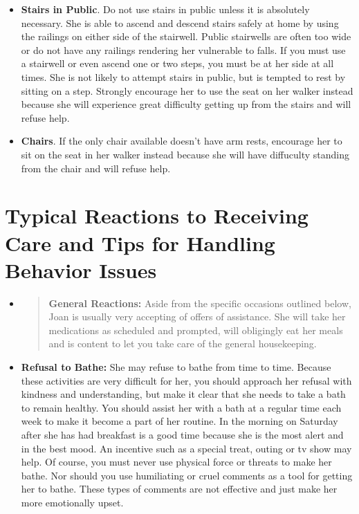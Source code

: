 \documentclass[]{article}
\begin{document}
\begin{itemize}
\item \textbf{Stairs in Public}. Do not use stairs in public unless it is absolutely necessary. She is able to ascend and descend stairs safely at home by using the railings on either side of the stairwell. Public stairwells are often too wide or do not have any railings rendering her vulnerable to falls. If you must use a stairwell or even ascend one or two steps, you must be at her side at all times. She is not likely to attempt stairs in public, but is tempted to rest by sitting on a step. Strongly encourage her to use the seat on her walker instead because she will experience great difficulty getting up from the stairs and will refuse help.
\item \textbf{Chairs}. If the only chair available doesn't have arm rests, encourage her to sit on the seat in her walker instead because she will have diffuculty standing from the chair and will refuse help.
\end{itemize}

\section*{Typical Reactions to Receiving Care and Tips for Handling Behavior Issues}

\begin{itemize}
\item
  \begin{quote}
  \textbf{General Reactions:} Aside from the specific occasions outlined
  below, Joan is usually very accepting of offers of assistance. She
  will take her medications as scheduled and prompted, will obligingly
  eat her meals and is content to let you take care of the general
  housekeeping.
  \end{quote}
\end{itemize}

\begin{itemize}
\item
  \textbf{Refusal to Bathe:} She may refuse to bathe from time to time.
  Because these activities are very difficult for her, you should
  approach her refusal with kindness and understanding, but make it
  clear that she needs to take a bath to remain healthy. You should
  assist her with a bath at a regular time each week to make it become a
  part of her routine. In the morning on Saturday after she has had
  breakfast is a good time because she is the most alert and in the best
  mood. An incentive such as a special treat, outing or tv show may
  help. Of course, you must never use physical force or threats to make
  her bathe. Nor should you use humiliating or cruel comments as a tool
  for getting her to bathe. These types of comments are not effective
  and just make her more emotionally upset.
\end{itemize}
\end{document}
